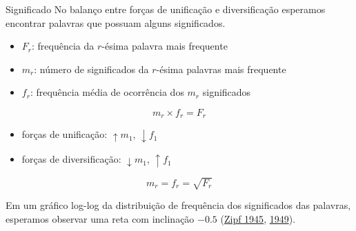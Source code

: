 \documentclass[
  ignorenonframetext,
  aspectratio=169]{beamer}
\providecommand{\tightlist}{%
  \setlength{\itemsep}{0pt}\setlength{\parskip}{0pt}}
\begin{document}
\begin{frame}{Significado}
\protect\hypertarget{significado}{}
No balanço entre forças de unificação e diversificação esperamos
encontrar palavras que possuam alguns significados.

\begin{itemize}
\tightlist
\item
  \(F_r\): frequência da \(r\)-ésima palavra mais frequente
\item
  \(m_r\): número de significados da \(r\)-ésima palavras mais frequente
\item
  \(f_r\): frequência média de ocorrência dos \(m_r\) significados
\end{itemize}

\[ 
m_r \times f_r = F_r
\]

\begin{itemize}
\tightlist
\item
  forças de unificação: \(\uparrow m_1\), \(\downarrow f_1\)
\item
  forças de diversificação: \(\downarrow m_1\), \(\uparrow f_1\)
\end{itemize}

\[
m_r = f_r = \sqrt{F_r}
\]

Em um gráfico log-log da distribuição de frequência dos significados das
palavras, esperamos observar uma reta com inclinação \(-0.5\)
(\protect\hyperlink{ref-zipf1945}{Zipf 1945},
\protect\hyperlink{ref-zipf1949}{1949}).

\end{frame}
\end{document}
